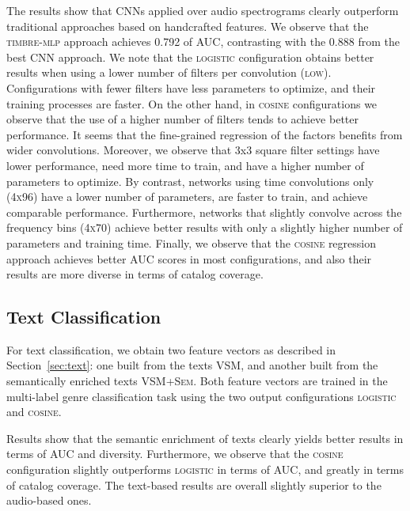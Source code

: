 \documentclass{article}
\begin{document}
The results show that CNNs applied over audio spectrograms clearly outperform traditional approaches based on handcrafted features. 
We observe that the \textsc{timbre-mlp} approach achieves 0.792 of AUC, contrasting with the 0.888 from the best CNN approach.
We note that the \textsc{logistic} configuration obtains better results when using a lower number of filters per convolution (\textsc{low}). Configurations with fewer filters have less parameters to optimize, and their training processes are faster. 
On the other hand, in \textsc{cosine} configurations we observe that the use of a higher number of filters tends to achieve better performance. 
It seems that the fine-grained regression of the factors benefits from wider convolutions.
Moreover, we observe that 3x3 square filter settings have lower performance, need more time to train, and have a higher number of parameters to optimize.
By contrast, networks using time convolutions only (\textsc{4x96}) have a lower number of parameters, are faster to train, and achieve comparable performance. 
Furthermore, networks that slightly convolve across the frequency bins (\textsc{4x70}) achieve better results with only a slightly higher number of parameters and training time. 
Finally, we observe that the \textsc{cosine} regression approach achieves better AUC scores in most configurations, and also their results are more diverse in terms of catalog coverage.





\subsection{Text Classification}\label{sec:textexp}

For text classification, we obtain two feature vectors as described in Section~\ref{sec:text}: one built from the texts \textsc{VSM}, and another built from the semantically enriched texts \textsc{VSM+Sem}. 
Both feature vectors are trained in the multi-label genre classification task using the two output configurations \textsc{logistic} and \textsc{cosine}.

Results show that the semantic enrichment of texts clearly yields better results in terms of AUC and diversity.
Furthermore, we observe that the \textsc{cosine} configuration slightly outperforms \textsc{logistic} in terms of AUC, and greatly in terms of catalog coverage. 
The text-based results are overall slightly superior to the audio-based ones. 
\end{document}
